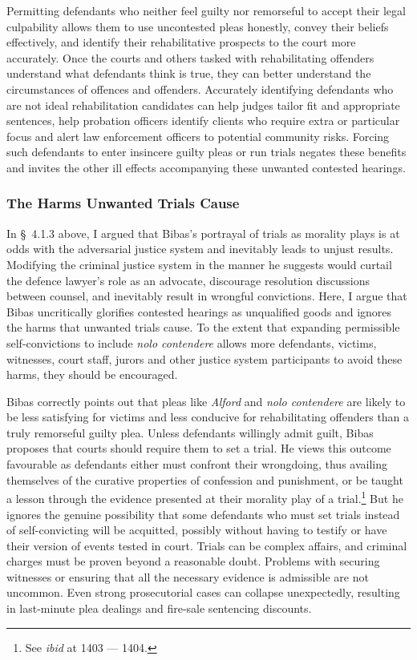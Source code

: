 Permitting defendants who neither feel guilty nor remorseful to accept their legal culpability allows them to use uncontested pleas honestly, convey their beliefs effectively, and identify their rehabilitative prospects to the court more accurately. Once the courts and others tasked with rehabilitating offenders understand what defendants think is true, they can better understand the circumstances of offences and offenders. Accurately identifying defendants who are not ideal rehabilitation candidates can help judges tailor fit and appropriate sentences, help probation officers identify clients who require extra or particular focus and alert law enforcement officers to potential community risks. Forcing such defendants to enter insincere guilty pleas or run trials negates these benefits and invites the other ill effects accompanying these unwanted contested hearings.

\subsubsection{The Harms Unwanted Trials Cause}

In § 4.1.3 above, I argued that Bibas's portrayal of trials as morality plays is at odds with the adversarial justice system and inevitably leads to unjust results. Modifying the criminal justice system in the manner he suggests would curtail the defence lawyer's role as an advocate, discourage resolution discussions between counsel, and inevitably result in wrongful convictions. Here, I argue that Bibas uncritically glorifies contested hearings as unqualified goods and ignores the harms that unwanted trials cause. To the extent that expanding permissible self-convictions to include \textit{nolo contendere} allows more defendants, victims, witnesses, court staff, jurors and other justice system participants to avoid these harms, they should be encouraged.

Bibas correctly points out that pleas like \textit{Alford} and \textit{nolo contendere} are likely to be less satisfying for victims and less conducive for rehabilitating offenders than a truly remorseful guilty plea. Unless defendants willingly admit guilt, Bibas proposes that courts should require them to set a trial. He views this outcome favourable as defendants either must confront their wrongdoing, thus availing themselves of the curative properties of confession and punishment, or be taught a lesson through the evidence presented at their morality play of a trial.\footnote{See \textit{ibid} at 1403 — 1404.} But he ignores the genuine possibility that some defendants who must set trials instead of self-convicting will be acquitted, possibly without having to testify or have their version of events tested in court. Trials can be complex affairs, and criminal charges must be proven beyond a reasonable doubt. Problems with securing witnesses or ensuring that all the necessary evidence is admissible are not uncommon. Even strong prosecutorial cases can collapse unexpectedly, resulting in last-minute plea dealings and fire-sale sentencing discounts. 

